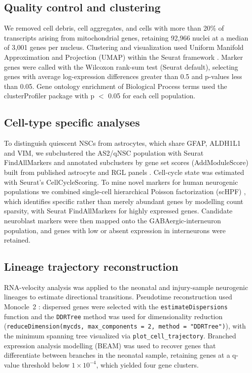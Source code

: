 \documentclass[11pt]{article}
\begin{document}
\subsection{Quality control and clustering}

We removed cell debris, cell aggregates, and cells with more than 20\% of
transcripts arising from mitochondrial genes, retaining 92{,}966 nuclei at a
median of 3{,}001 genes per nucleus. Clustering and visualization used
Uniform Manifold Approximation and Projection (UMAP) within the Seurat
framework \cite{butler2018integrating}. Marker genes were called with the
Wilcoxon rank-sum test (Seurat default), selecting genes with average log-expression
differences greater than 0.5 and p-values less than 0.05. Gene ontology
enrichment of Biological Process terms used the clusterProfiler package
with p $<$ 0.05 for each cell population.

\subsection{Cell-type specific analyses}

To distinguish quiescent NSCs from astrocytes, which share GFAP, ALDH1L1 and
VIM, we subclustered the AS2/qNSC population with Seurat FindAllMarkers and
annotated subclusters by gene set scores (AddModuleScore) built from published
astrocyte and RGL panels \cite{zamanian2012genomic,liddelow2017neurotoxic,clarke2018normal,hochgerner2018conserved,zhong2020decoding,franjic2022transcriptomic}.
Cell-cycle state was estimated with Seurat's CellCycleScoring.
To mine novel markers for human neurogenic populations we combined
single-cell hierarchical Poisson factorization (scHPF)
\cite{levitin2019gene}, which identifies specific rather than merely abundant
genes by modelling count sparsity, with Seurat FindAllMarkers for highly
expressed genes. Candidate neuroblast markers were then mapped onto the
GABAergic-interneuron population, and genes with low or absent expression
in interneurons were retained.

\subsection{Lineage trajectory reconstruction}

RNA-velocity analysis \cite{lamanno2018rna} was applied to the neonatal and
injury-sample neurogenic lineages to estimate directional transitions.
Pseudotime reconstruction used Monocle~2 \cite{trapnell2014dynamics}: dispersed
genes were selected with the \texttt{estimateDispersions} function and the
\texttt{DDRTree} method was used for dimensionality reduction
(\texttt{reduceDimension(mycds, max\_components = 2, method = "DDRTree")}),
with the minimum spanning tree visualized via \texttt{plot\_cell\_trajectory}.
Branched expression analysis modelling (BEAM) was used to recover genes that
differentiate between branches in the neonatal sample, retaining genes at a
q-value threshold below $1\times 10^{-4}$, which yielded four gene clusters.
\end{document}
